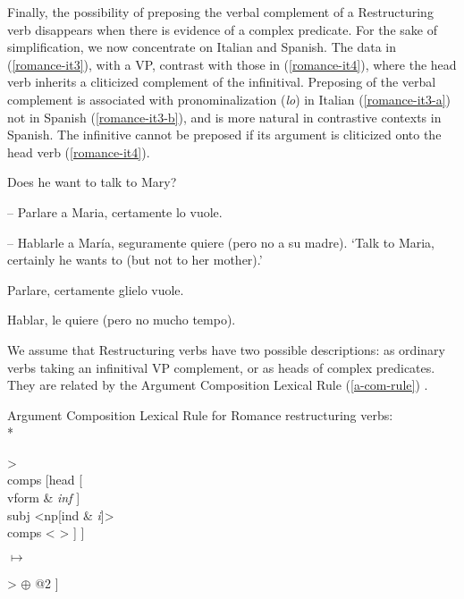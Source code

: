 \documentclass[output=paper]{langsci/langscibook}
\begin{document}
Finally, the possibility of preposing the verbal complement of a Restructuring verb disappears when there is evidence of a complex predicate. For the sake of simplification, we now concentrate on Italian and Spanish. The data in (\ref{romance-it3}), with a VP, contrast with those in (\ref{romance-it4}), where the head verb inherits a cliticized complement of the infinitival. Preposing of the verbal complement is associated with pronominalization (\textit{lo}) in Italian (\ref{romance-it3-a}) not in Spanish (\ref{romance-it3-b}), and is more natural in contrastive contexts in Spanish. The infinitive cannot be preposed if its argument is cliticized onto the head verb (\ref{romance-it4}).


\begin{exe}
	\ex Does he want to talk to Mary?  \label{romance-it3}
	
	\begin{xlist}
		
		\ex  -- Parlare a Maria, certamente lo vuole. \label{romance-it3-a}
		
		\ex  -- Hablarle a Mar\'ia, seguramente quiere (pero no a su madre). \label{romance-it3-b}
		\glt `Talk to Maria, certainly he wants to (but not to her mother).'
		
	\end{xlist}
	
\end{exe}


\begin{exe}
	\ex  \label{romance-it4}
	
	\begin{xlist}
		
		\ex *Parlare, certamente glielo vuole.
		
		\ex *Hablar, le quiere (pero no mucho tempo).
		
	\end{xlist}
	
\end{exe}

We assume that Restructuring verbs have two possible descriptions: as ordinary verbs taking an infinitival VP complement, or as heads of complex predicates. They are related by the Argument Composition Lexical Rule (\ref{a-com-rule}) \citep{Monachesi98a}.  


\ea
\label{a-com-rule} 
Argument Composition Lexical Rule for Romance restructuring verbs:\\*
\begin{avm}
	[{}head \normalfont{\textit{verb}}\\
	Light   +\\
	subj <np [{}ind & \textit{i}]>\\
	comps [{}head [{}\\
	vform & \textit{inf}
	]\\
	subj   <np[{}ind & \textit{i}]>\\
	comps <  >        
	]
	]
\end{avm}     $\mapsto$        \begin{avm}
	[{}comps < [{}\normalfont{\textit{basic-verb}}\\
	comps @2
	] > $\oplus$ @2
	] 
	
\end{avm}
\z
\end{document}

